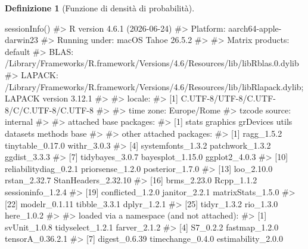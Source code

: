 \documentclass[
  italian,
  letterpaper,
  a4paper,
  11pt,
  open=any]{scrbook}
\newenvironment{Shaded}{\begin{snugshade}}{\end{snugshade}}
\newcommand{\CommentTok}[1]{\textcolor[rgb]{0.37,0.37,0.37}{#1}}
\newcommand{\FunctionTok}[1]{\textcolor[rgb]{0.28,0.35,0.67}{#1}}
\newcommand{\NormalTok}[1]{\textcolor[rgb]{0.00,0.23,0.31}{#1}}
\theoremstyle{plain}
\theoremstyle{definition}
\theoremstyle{definition}
\newtheorem{definition}{Definizione}[chapter]
\theoremstyle{remark}
\begin{document}
\begin{definition}[Funzione di densità di
probabilità]
\begin{tcolorbox}
\begin{Shaded}
\begin{Highlighting}[]
\FunctionTok{sessionInfo}\NormalTok{()}
\CommentTok{\#\textgreater{} R version 4.6.1 (2026{-}06{-}24)}
\CommentTok{\#\textgreater{} Platform: aarch64{-}apple{-}darwin23}
\CommentTok{\#\textgreater{} Running under: macOS Tahoe 26.5.2}
\CommentTok{\#\textgreater{} }
\CommentTok{\#\textgreater{} Matrix products: default}
\CommentTok{\#\textgreater{} BLAS:   /Library/Frameworks/R.framework/Versions/4.6/Resources/lib/libRblas.0.dylib }
\CommentTok{\#\textgreater{} LAPACK: /Library/Frameworks/R.framework/Versions/4.6/Resources/lib/libRlapack.dylib;  LAPACK version 3.12.1}
\CommentTok{\#\textgreater{} }
\CommentTok{\#\textgreater{} locale:}
\CommentTok{\#\textgreater{} [1] C.UTF{-}8/UTF{-}8/C.UTF{-}8/C/C.UTF{-}8/C.UTF{-}8}
\CommentTok{\#\textgreater{} }
\CommentTok{\#\textgreater{} time zone: Europe/Rome}
\CommentTok{\#\textgreater{} tzcode source: internal}
\CommentTok{\#\textgreater{} }
\CommentTok{\#\textgreater{} attached base packages:}
\CommentTok{\#\textgreater{} [1] stats     graphics  grDevices utils     datasets  methods   base     }
\CommentTok{\#\textgreater{} }
\CommentTok{\#\textgreater{} other attached packages:}
\CommentTok{\#\textgreater{}  [1] ragg\_1.5.2            tinytable\_0.17.0      withr\_3.0.3          }
\CommentTok{\#\textgreater{}  [4] systemfonts\_1.3.2     patchwork\_1.3.2       ggdist\_3.3.3         }
\CommentTok{\#\textgreater{}  [7] tidybayes\_3.0.7       bayesplot\_1.15.0      ggplot2\_4.0.3        }
\CommentTok{\#\textgreater{} [10] reliabilitydiag\_0.2.1 priorsense\_1.2.0      posterior\_1.7.0      }
\CommentTok{\#\textgreater{} [13] loo\_2.10.0            rstan\_2.32.7          StanHeaders\_2.32.10  }
\CommentTok{\#\textgreater{} [16] brms\_2.23.0           Rcpp\_1.1.2            sessioninfo\_1.2.4    }
\CommentTok{\#\textgreater{} [19] conflicted\_1.2.0      janitor\_2.2.1         matrixStats\_1.5.0    }
\CommentTok{\#\textgreater{} [22] modelr\_0.1.11         tibble\_3.3.1          dplyr\_1.2.1          }
\CommentTok{\#\textgreater{} [25] tidyr\_1.3.2           rio\_1.3.0             here\_1.0.2           }
\CommentTok{\#\textgreater{} }
\CommentTok{\#\textgreater{} loaded via a namespace (and not attached):}
\CommentTok{\#\textgreater{}  [1] svUnit\_1.0.8          tidyselect\_1.2.1      farver\_2.1.2         }
\CommentTok{\#\textgreater{}  [4] S7\_0.2.2              fastmap\_1.2.0         tensorA\_0.36.2.1     }
\CommentTok{\#\textgreater{}  [7] digest\_0.6.39         timechange\_0.4.0      estimability\_2.0.0   }

\end{Highlighting}
\end{Shaded}
\end{tcolorbox}
\end{definition}
\end{document}
